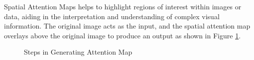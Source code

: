 Spatial Attention Maps helps to highlight regions of interest within images or data, aiding in the interpretation and understanding of complex visual information. The original image acts as the input, and the spatial attention map overlays above the original image to produce an output as shown in Figure \ref{fig:attmap}.

\begin{figure}[h!]
\centering
{}
\hfill
{}
\hfill
{}
\caption{Steps in Generating Attention Map}
\label{fig:attmap}
\end{figure}

